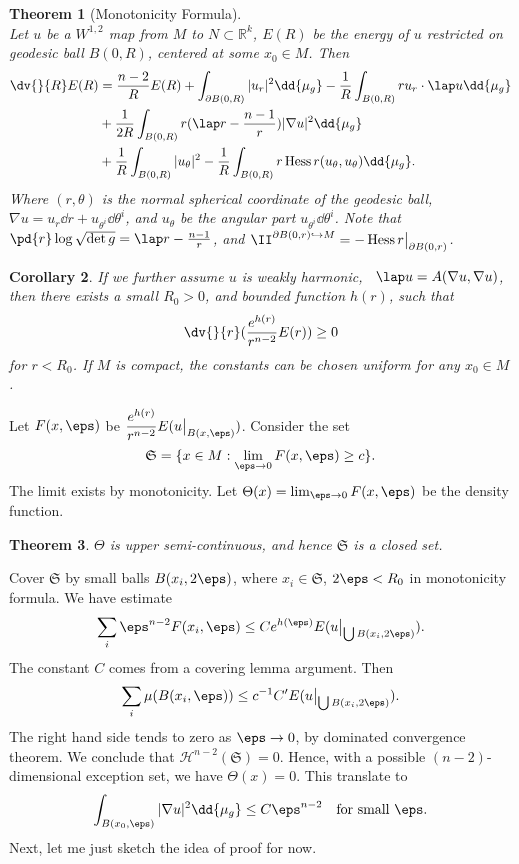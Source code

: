 \documentclass[UTF8,12pt]{article}
\theoremstyle{plain}\newtheorem{theorem}{Theorem}
\theoremstyle{definition}\newtheorem{definition}[theorem]{Definition}
\theoremstyle{definition}\newtheorem{example}[theorem]{Example}
\theoremstyle{plain}\newtheorem{axiom}[theorem]{Axiom}
\theoremstyle{plain}\newtheorem{assertion}[theorem]{Assertion}
\theoremstyle{plain}\newtheorem{corollary}[theorem]{Corollary}
\theoremstyle{plain}\newtheorem{lemma}[theorem]{Lemma}
\theoremstyle{plain}\newtheorem{proposition}[theorem]{Proposition}
\theoremstyle{plain}\newtheorem{prop}[theorem]{Proposition}
\theoremstyle{plain}\newtheorem{conjecture}[theorem]{Conjecture}
\theoremstyle{plain}\newtheorem{conj}[theorem]{Conjecture}
\theoremstyle{plain}\newtheorem{problem}[theorem]{Problem}
\theoremstyle{remark}\newtheorem{notation}[theorem]{Notation}
\theoremstyle{definition}\newtheorem*{question}{Question}
\theoremstyle{definition}\newtheorem*{answer}{Answer}
\theoremstyle{definition}\newtheorem*{goal}{Goal}
\theoremstyle{plain}\newtheorem*{application}{Application}
\theoremstyle{plain}\newtheorem*{exercise}{Exercise}
\theoremstyle{remark}\newtheorem*{remark}{Remark}
\theoremstyle{remark}\newtheorem*{note}{\small{Note}}
\numberwithin{equation}{section}
\numberwithin{theorem}{section}
\numberwithin{figure}{section}
\DeclareMathOperator{\Hess}{Hess}
\begin{document}
\begin{theorem}[Monotonicity Formula]\hfill\\
    Let \(u\) be a \(W^{1,2}\) map from \(M\) to \(N\subset \mathbb{R}^k\),
    \(E(R)\) be the energy of \(u\) restricted on geodesic ball \(B(0,R)\),
    centered at some \(x_0\in M\). Then 
    \begin{equation}\label{eq:monotonicity}
    \begin{split}
        \dv{}{R}E(R)&=\frac{n-2}{R}E(R)+\int_{\partial B(0,R)}|u_r|^2\dd{\mu_g}
        -\frac{1}{R}\int_{B(0,R)}ru_r\cdot \lap u\dd{\mu_g} \\
        &+\frac{1}{2R}\int_{B(0,R)}r(\lap r-\frac{n-1}{r})|\nabla u|^2\dd{\mu_g}\\
        &+\frac{1}{R}\int_{B(0,R)}|u_\theta|^2
        -\frac{1}{R}\int_{B(0,R)}r\Hess r(u_\theta,u_\theta)\dd{\mu_g}.
    \end{split}\end{equation}
    Where \((r,\theta)\) is the normal spherical coordinate of the geodesic ball,
    \(\nabla u=u_r\dd{r}+u_{\theta^i}\dd{\theta^i}\), and \(u_\theta\) be the
    angular part \(u_{\theta^i}\dd{\theta^i}\).
    Note that \(\pd{r}\log\sqrt{\det g}=\lap r-\frac{n-1}{r}\), and
    \(\II^{\partial B(0,r)\hookrightarrow M}=-\Hess r\big|_{\partial B(0,r)}\).
\end{theorem}
\begin{corollary}
    If we further assume \(u\) is weakly harmonic, \ie\ \(\lap u=A(\nabla u,
    \nabla u)\), then there exists a small \(R_0>0\), and bounded function \(h(r)\),
    such that \[
        \dv{}{r}(\frac{e^{h(r)}}{r^{n-2}}E(r))\ge 0
    \] for \(r<R_0\). If \(M\) is compact, the constants can be chosen uniform for any
    \(x_0\in M\).
\end{corollary}

Let \(F(x,\eps)\) be \(\displaystyle\frac{e^{h(r)}}{r^{n-2}}E(u\big|_{B(x,\eps)})\).
Consider the set \[
    \mathfrak{S}=\{x\in M:\lim_{\eps\to 0}F(x,\eps)\ge c\}
.\] The limit exists by monotonicity. Let \(\Theta(x)=\lim_{\eps\to 0}F(x,\eps)\)
be the density function.
\begin{theorem}
    \(\Theta\) is upper semi-continuous, and hence \(\mathfrak{S}\) is a closed set.
\end{theorem}
Cover \(\mathfrak{S}\) by small balls \(B(x_i,2\eps)\), where \(x_i\in\mathfrak{S}
\), \(2\eps<R_0\) in monotonicity formula. We have estimate \[
    \sum_i \eps^{n-2}F(x_i,\eps)\le Ce^{h(\eps)}E(u\big|_{\bigcup B(x_i,2\eps)})
.\] The constant \(C\) comes from a covering lemma argument. Then \[
    \sum_i \mu(B(x_i,\eps))\le c^{-1}C' E(u\big|_{\bigcup B(x_i,2\eps)})
.\] The right hand side tends to zero as \(\eps\to 0\), by dominated convergence
theorem. We conclude that \(\mathcal{H}^{n-2}(\mathfrak{S})=0\). Hence, with a
possible \((n-2)\)-dimensional exception set, we have \(\Theta(x)=0\). This translate
to \[
    \int_{B(x_0,\eps)}|\nabla u|^2\dd{\mu_g}\le C\eps^{n-2}
    \quad\text{for small }\eps
.\] Next, let me just sketch the idea of proof for now.
\end{document}
